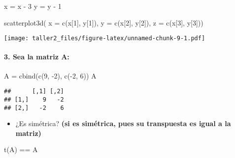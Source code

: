 \documentclass[
]{article}
\newenvironment{Shaded}{\begin{snugshade}}{\end{snugshade}}
\newcommand{\AttributeTok}[1]{\textcolor[rgb]{0.77,0.63,0.00}{#1}}
\newcommand{\DecValTok}[1]{\textcolor[rgb]{0.00,0.00,0.81}{#1}}
\newcommand{\FunctionTok}[1]{\textcolor[rgb]{0.00,0.00,0.00}{#1}}
\newcommand{\NormalTok}[1]{#1}
\newcommand{\OtherTok}[1]{\textcolor[rgb]{0.56,0.35,0.01}{#1}}
\newcommand{\SpecialCharTok}[1]{\textcolor[rgb]{0.00,0.00,0.00}{#1}}
\providecommand{\tightlist}{%
  \setlength{\itemsep}{0pt}\setlength{\parskip}{0pt}}
\begin{document}
\begin{Shaded}
\begin{Highlighting}[]
\NormalTok{x }\OtherTok{=}\NormalTok{ x }\SpecialCharTok{{-}} \DecValTok{3}
\NormalTok{y }\OtherTok{=}\NormalTok{ y }\SpecialCharTok{{-}} \DecValTok{1}

\FunctionTok{scatterplot3d}\NormalTok{( }\AttributeTok{x =} \FunctionTok{c}\NormalTok{(x[}\DecValTok{1}\NormalTok{], y[}\DecValTok{1}\NormalTok{]), }\AttributeTok{y =} \FunctionTok{c}\NormalTok{(x[}\DecValTok{2}\NormalTok{], y[}\DecValTok{2}\NormalTok{]), }\AttributeTok{z =} \FunctionTok{c}\NormalTok{(x[}\DecValTok{3}\NormalTok{], y[}\DecValTok{3}\NormalTok{]))}
\end{Highlighting}
\end{Shaded}

\texttt{[image: taller2\_files/figure-latex/unnamed-chunk-9-1.pdf]}

\hypertarget{sea-la-matriz-a}{%
\paragraph{3. Sea la matriz A:}\label{sea-la-matriz-a}}

\begin{Shaded}
\begin{Highlighting}[]
\NormalTok{A }\OtherTok{=} \FunctionTok{cbind}\NormalTok{(}\FunctionTok{c}\NormalTok{(}\DecValTok{9}\NormalTok{, }\SpecialCharTok{{-}}\DecValTok{2}\NormalTok{), }\FunctionTok{c}\NormalTok{(}\SpecialCharTok{{-}}\DecValTok{2}\NormalTok{, }\DecValTok{6}\NormalTok{))}
\NormalTok{A}
\end{Highlighting}
\end{Shaded}

\begin{verbatim}
##      [,1] [,2]
## [1,]    9   -2
## [2,]   -2    6
\end{verbatim}

\begin{itemize}
\tightlist
\item
  ¿Es simétrica? \textbf{(si es simétrica, pues su transpuesta es igual
  a la matriz)}
\end{itemize}

\begin{Shaded}
\begin{Highlighting}[]
\FunctionTok{t}\NormalTok{(A) }\SpecialCharTok{==}\NormalTok{ A}
\end{Highlighting}
\end{Shaded}
\end{document}
